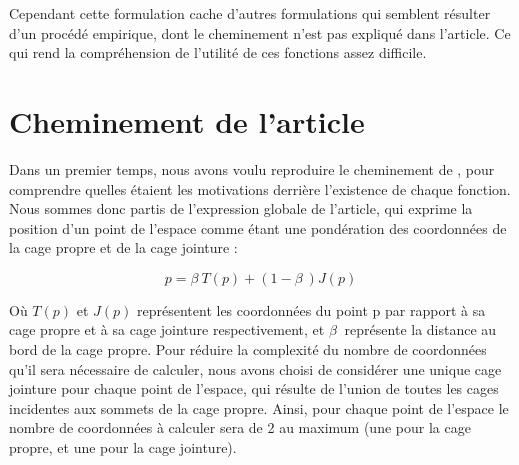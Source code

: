Cependant cette formulation cache d'autres formulations qui semblent
résulter d'un procédé empirique, dont le cheminement n'est pas
expliqué dans l'article. Ce qui rend la compréhension de l'utilité de
ces fonctions assez difficile.

\section{Cheminement de l'article}
Dans un premier temps, nous avons voulu reproduire le cheminement de
\cite{GPCP13}, pour comprendre quelles étaient les motivations
derrière l'existence de chaque fonction. Nous sommes donc partis de
l'expression globale de l'article, qui exprime la position d'un point
de l'espace comme étant une pondération des coordonnées de la cage
propre et de la cage jointure :

\begin{equation}
  p = \beta~ T(p)  + (1 - \beta~) J(p) 
  \label{MELgen}
\end{equation}

Où $T(p)$ et $J(p)$ représentent les coordonnées du point p par
rapport à sa cage propre et à sa cage jointure respectivement, et
$\beta~$ représente la distance au bord de la cage propre. Pour
réduire la complexité du nombre de coordonnées qu'il sera nécessaire
de calculer, nous avons choisi de considérer une unique cage jointure
pour chaque point de l'espace, qui résulte de l'union de toutes les
cages incidentes aux sommets de la cage propre. Ainsi, pour chaque
point de l'espace le nombre de coordonnées à calculer sera de 2 au
maximum (une pour la cage propre, et une pour la cage jointure).


